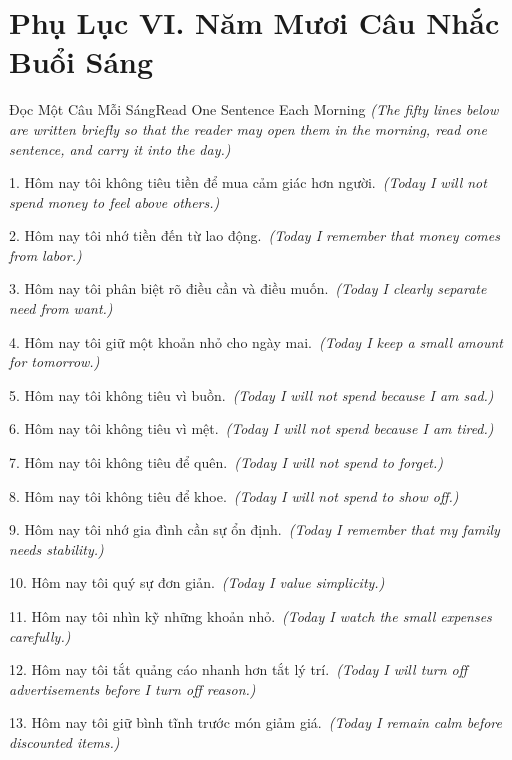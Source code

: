 \chapter*{Phụ Lục VI. Năm Mươi Câu Nhắc Buổi Sáng}

\begin{truyen}{Đọc Một Câu Mỗi Sáng}{Read One Sentence Each Morning}
\textit{(The fifty lines below are written briefly so that the reader may open them in the morning, read one sentence, and carry it into the day.)}

1. Hôm nay tôi không tiêu tiền để mua cảm giác hơn người.\
\textit{(Today I will not spend money to feel above others.)}

2. Hôm nay tôi nhớ tiền đến từ lao động.\
\textit{(Today I remember that money comes from labor.)}

3. Hôm nay tôi phân biệt rõ điều cần và điều muốn.\
\textit{(Today I clearly separate need from want.)}

4. Hôm nay tôi giữ một khoản nhỏ cho ngày mai.\
\textit{(Today I keep a small amount for tomorrow.)}

5. Hôm nay tôi không tiêu vì buồn.\
\textit{(Today I will not spend because I am sad.)}

6. Hôm nay tôi không tiêu vì mệt.\
\textit{(Today I will not spend because I am tired.)}

7. Hôm nay tôi không tiêu để quên.\
\textit{(Today I will not spend to forget.)}

8. Hôm nay tôi không tiêu để khoe.\
\textit{(Today I will not spend to show off.)}

9. Hôm nay tôi nhớ gia đình cần sự ổn định.\
\textit{(Today I remember that my family needs stability.)}

10. Hôm nay tôi quý sự đơn giản.\
\textit{(Today I value simplicity.)}

11. Hôm nay tôi nhìn kỹ những khoản nhỏ.\
\textit{(Today I watch the small expenses carefully.)}

12. Hôm nay tôi tắt quảng cáo nhanh hơn tắt lý trí.\
\textit{(Today I will turn off advertisements before I turn off reason.)}

13. Hôm nay tôi giữ bình tĩnh trước món giảm giá.\
\textit{(Today I remain calm before discounted items.)}


\end{truyen}
